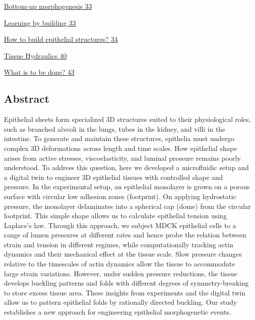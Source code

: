 \documentclass[
]{article}
\begin{document}
\protect\hyperlink{bottom-up-morphogenesis-1}{Bottom-up morphogenesis
\protect\hyperlink{bottom-up-morphogenesis-1}{33}}

\protect\hyperlink{learning-by-building}{Learning by building
\protect\hyperlink{learning-by-building}{33}}

\protect\hyperlink{how-to-build-epithelial-structures}{How to build
epithelial structures?
\protect\hyperlink{how-to-build-epithelial-structures}{34}}

\protect\hyperlink{tissue-hydraulics}{Tissue Hydraulics
\protect\hyperlink{tissue-hydraulics}{40}}

\protect\hyperlink{what-is-to-be-done}{What is to be done?
\protect\hyperlink{what-is-to-be-done}{43}}

\hypertarget{abstract}{%
\subsection{\texorpdfstring{ Abstract}{ Abstract}}\label{abstract}}

Epithelial sheets form specialized 3D structures suited to their
physiological roles, such as branched alveoli in the lungs, tubes in the
kidney, and villi in the intestine. To generate and maintain these
structures, epithelia must undergo complex 3D deformations across length
and time scales. How epithelial shape arises from active stresses,
viscoelasticity, and luminal pressure remains poorly understood. To
address this question, here we developed a microfluidic setup and a
digital twin to engineer 3D epithelial tissues with controlled shape and
pressure. In the experimental setup, an epithelial monolayer is grown on
a porous surface with circular low adhesion zones (footprint). On
applying hydrostatic pressure, the monolayer delaminates into a
spherical cap (dome) from the circular footprint. This simple shape
allows us to calculate epithelial tension using Laplace's law. Through
this approach, we subject MDCK epithelial cells to a range of lumen
pressures at different rates and hence probe the relation between strain
and tension in different regimes, while computationally tracking actin
dynamics and their mechanical effect at the tissue scale. Slow pressure
changes relative to the timescales of actin dynamics allow the tissue to
accommodate large strain variations. However, under sudden pressure
reductions, the tissue develops buckling patterns and folds with
different degrees of symmetry-breaking to store excess tissue area.
These insights from experiments and the digital twin allow us to pattern
epithelial folds by rationally directed buckling. Our study establishes
a new approach for engineering epithelial morphogenetic events.
\end{document}
